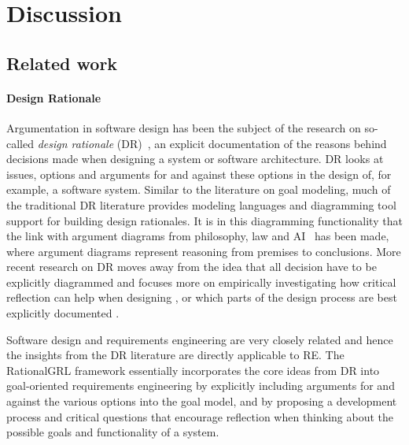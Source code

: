 \section{Discussion}
\label{sect:discussion}

\subsection{Related work}
\label{sect:discussions:relatedwork}

\paragraph{Design Rationale} Argumentation in software design has been the subject of the research on so-called \emph{design rationale} (DR)~\cite{shum2006hypermedia}, an explicit documentation of the reasons behind decisions made when designing a system or software architecture. DR looks at issues, options and arguments for and against these options in the design of, for example, a software system. Similar to the literature on goal modeling, much of the traditional DR literature provides modeling languages and diagramming tool support for building design rationales. It is in this diagramming functionality that the link with argument diagrams from philosophy, law and AI~\cite{reed2004araucaria,gordon2007visualizing} has been made, where argument diagrams represent reasoning from premises to conclusions. More recent research on DR moves away from the idea that all decision have to be explicitly diagrammed and focuses more on empirically investigating how critical reflection can help when designing \cite{razavian2016two,SchriekEtal2016}, or which parts of the design process are best explicitly documented \cite{falessi2013value}. 

Software design and requirements engineering are very closely related \cite{nuseibeh2001weaving} and hence the insights from the DR literature are directly applicable to RE. The RationalGRL framework essentially incorporates the core ideas from DR into goal-oriented requirements engineering by explicitly including arguments for and against the various options into the goal model, and by proposing a development process and critical questions that encourage reflection when thinking about the possible goals and functionality of a system. 

